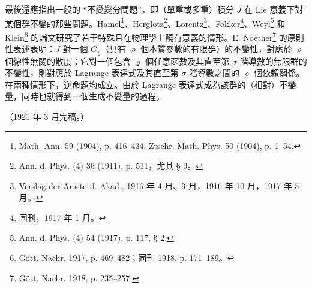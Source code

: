 \documentclass[11pt]{article}
\providecommand{\glqq}{“}
\providecommand{\grqq}{”}
\begin{document}
最後還應指出一般的 \glqq{}不變變分問題\grqq{}，即（單重或多重）積分 $J$ 在 Lie 意義下對某個群不變的那些問題。Hamel\footnote{Math. Ann. 59 (1904), p. 416--434; Ztschr. Math. Phys. 50 (1904), p. 1--54.}、Herglotz\footnote{Ann. d. Phys. (4) 36 (1911), p. 511，尤其 § 9。}、Lorentz\footnote{Verslag der Amsterd. Akad., 1916 年 4 月、9 月，1916 年 10 月，1917 年 5 月。}、Fokker\footnote{同刊，1917 年 1 月。}、Weyl\footnote{Ann. d. Phys. (4) 54 (1917), p. 117, § 2.} 和 Klein\footnote{Gött. Nachr. 1917, p. 469--482；同刊 1918, p. 171--189。} 的論文研究了若干特殊且在物理學上饒有意義的情形。E. Noether\footnote{Gött. Nachr. 1918, p. 235--257.} 的原則性表述表明：$J$ 對一個 $G_\varrho$（具有 $\varrho$ 個本質參數的有限群）的不變性，對應於 $\varrho$ 個線性無關的散度；它對一個包含 $\varrho$ 個任意函數及其直至第 $\sigma$ 階導數的無限群的不變性，則對應於 Lagrange 表達式及其直至第 $\sigma$ 階導數之間的 $\varrho$ 個依賴關係。在兩種情形下，逆命題均成立。由於 Lagrange 表達式成為該群的（相對）不變量，同時也就得到一個生成不變量的過程。

\begin{center}
（1921 年 3 月完稿。）
\end{center}
\endgroup

\clearpage
\setcounter{footnote}{0}
\end{document}
